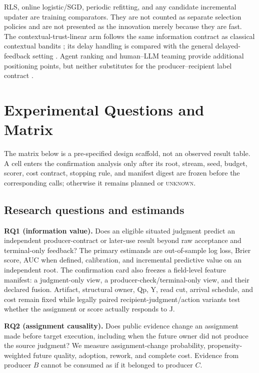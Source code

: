 \documentclass[sigconf,anonymous]{aamas}
\newcommand{\unknown}{\textsc{unknown}}
\begin{document}
RLS, online logistic/SGD, periodic refitting, and any candidate incremental updater are training comparators. They are not counted as separate selection policies and are not presented as the innovation merely because they are fast. The contextual-trust-linear arm follows the same information contract as classical contextual bandits \cite{li2010contextual}; its delay handling is compared with the general delayed-feedback setting \cite{joulani2013delayed}. Agent ranking and human--LLM teaming provide additional positioning points, but neither substitutes for the producer--recipient label contract \cite{lanctot2025soft,yurrita2026guidelines}.

\section{Experimental Questions and Matrix}
\label{sec:experiments}

The matrix below is a pre-specified design scaffold, not an observed result table. A cell enters
the confirmation analysis only after its root, stream, seed, budget, scorer, cost contract,
stopping rule, and manifest digest are frozen before the corresponding calls; otherwise it
remains planned or \unknown{}.

\subsection{Research questions and estimands}
\textbf{RQ1 (information value).} Does an eligible situated judgment predict an independent producer-contract or later-use result beyond raw acceptance and terminal-only feedback? The primary estimands are out-of-sample log loss, Brier score, AUC when defined, calibration, and incremental predictive value on an independent root. The confirmation card also freezes a field-level feature manifest: a judgment-only view, a producer-check/terminal-only view, and their declared fusion. Artifact, structural owner, Qp, Y, read cut, arrival schedule, and cost remain fixed while legally paired recipient-judgment/action variants test whether the assignment or score actually responds to J.

\textbf{RQ2 (assignment causality).} Does public evidence change an assignment made before target execution, including when the future owner did not produce the source judgment? We measure assignment-change probability, propensity-weighted future quality, adoption, rework, and complete cost. Evidence from producer $B$ cannot be consumed as if it belonged to producer $C$.
\end{document}
